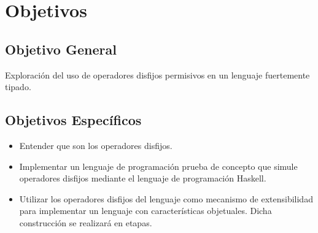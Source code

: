\chapter{Objetivos}
\section{Objetivo General}
Exploración del uso de operadores disfijos permisivos en un lenguaje fuertemente tipado.
\section{Objetivos Específicos}
\begin{itemize}
\item Entender que son los operadores disfijos.
\item Implementar un lenguaje de programación prueba de concepto que simule operadores
  disfijos mediante el lenguaje de programación Haskell.
\item Utilizar los operadores disfijos del lenguaje como mecanismo de
  extensibilidad para implementar un lenguaje con características
  objetuales. Dicha construcción se realizará en etapas.
\end{itemize}
